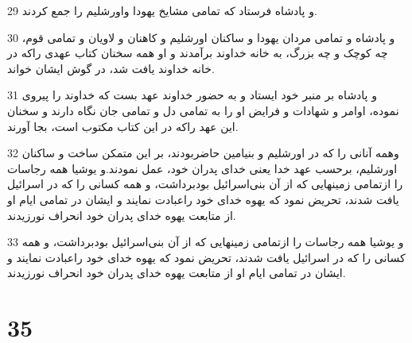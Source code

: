 \par 29 و پادشاه فرستاد که تمامی مشایخ یهودا واورشلیم را جمع کردند.
\par 30 و پادشاه و تمامی مردان یهودا و ساکنان اورشلیم و کاهنان و لاویان و تمامی قوم، چه کوچک و چه بزرگ، به خانه خداوند برآمدند و او همه سخنان کتاب عهدی راکه در خانه خداوند یافت شد، در گوش ایشان خواند.
\par 31 و پادشاه بر منبر خود ایستاد و به حضور خداوند عهد بست که خداوند را پیروی نموده، اوامر و شهادات و فرایض او را به تمامی دل و تمامی جان نگاه دارند و سخنان این عهد راکه در این کتاب مکتوب است، بجا آورند.
\par 32 وهمه آنانی را که در اورشلیم و بنیامین حاضربودند، بر این متمکن ساخت و ساکنان اورشلیم، برحسب عهد خدا یعنی خدای پدران خود، عمل نمودند.و یوشیا همه رجاسات را ازتمامی زمینهایی که از آن بنی‌اسرائیل بودبرداشت، و همه کسانی را که در اسرائیل یافت شدند، تحریض نمود که یهوه خدای خود راعبادت نمایند و ایشان در تمامی ایام او از متابعت یهوه خدای پدران خود انحراف نورزیدند.
\par 33 و یوشیا همه رجاسات را ازتمامی زمینهایی که از آن بنی‌اسرائیل بودبرداشت، و همه کسانی را که در اسرائیل یافت شدند، تحریض نمود که یهوه خدای خود راعبادت نمایند و ایشان در تمامی ایام او از متابعت یهوه خدای پدران خود انحراف نورزیدند. 
 
\chapter{35}

